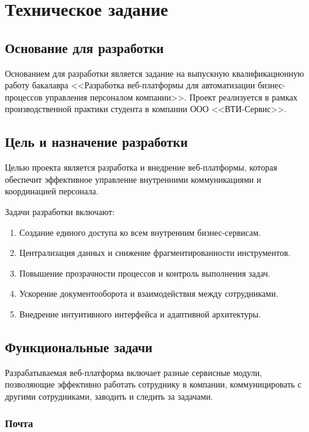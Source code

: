\section{Техническое задание}

\subsection{Основание для разработки}

Основанием для разработки является задание на выпускную квалификационную работу бакалавра <<Разработка веб-платформы для автоматизации бизнес-процессов управления персоналом компании>>. Проект реализуется в рамках производственной практики студента в компании ООО <<ВТИ-Сервис>>.

\subsection{Цель и назначение разработки}

Целью проекта является разработка и внедрение веб-платформы, которая обеспечит эффективное управление внутренними коммуникациями и координацией персонала.

Задачи разработки включают:

\begin{enumerate}
  \item Создание единого доступа ко всем внутренним бизнес-сервисам.
  \item Централизация данных и снижение фрагментированности инструментов.
  \item Повышение прозрачности процессов и контроль выполнения задач.
  \item Ускорение документооборота и взаимодействия между сотрудниками.
  \item Внедрение интуитивного интерфейса и адаптивной архитектуры.
\end{enumerate}

\subsection{Функциональные задачи}

Разрабатываемая веб-платформа включает разные сервисные модули, позволяющие эффективно работать сотруднику в компании, коммуницировать с другими сотрудниками, заводить и следить за задачами.

\subsubsection{Почта}

